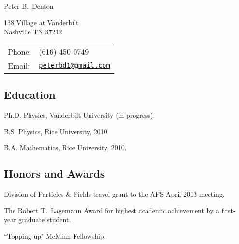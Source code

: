 \documentclass[letterpaper]{article}
\def\name{Peter B.~Denton}
\renewenvironment{itemize}{
\begin{list}{}{
\setlength{\leftmargin}{1.5em}
}
}{
\end{list}
}
\begin{document}
{\huge \name}


\vspace{0.1in}

\begin{minipage}{0.45\linewidth}
138 Village at Vanderbilt\\
Nashville TN 37212
\end{minipage}
\begin{minipage}{0.45\linewidth}
\begin{tabular}{ll}
Phone: & (616) 450-0749\\
Email: & \href{mailto:peterbd1@gmail.com}{\tt peterbd1@gmail.com} \\
\end{tabular}
\end{minipage}
\subsection*{Education}
\begin{itemize}
\item Ph.D. Physics, Vanderbilt University (in progress).
\item B.S. Physics, Rice University, 2010.
\item B.A. Mathematics, Rice University, 2010.
\end{itemize}
\subsection*{Honors and Awards}
\begin{itemize}
\item Division of Particles \& Fields travel grant to the APS April 2013 meeting.
\item The Robert T.~Lagemann Award for highest academic achievement by a first-year graduate student.
\item ``Topping-up" McMinn Fellowship.
\end{itemize}
\end{document}
